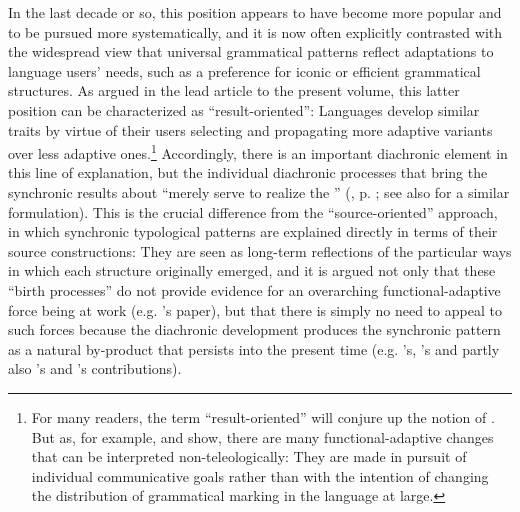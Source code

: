 \documentclass[output=paper]{langsci/langscibook}
\begin{document}
In the last decade or so, this position appears to have become more popular and to be pursued more systematically, and it is now often explicitly contrasted with the widespread view that universal grammatical patterns reflect adaptations to language users’ needs, such as a preference for iconic or efficient grammatical structures. As argued in the lead article to the present volume, this latter position can be characterized as “result-oriented”: Languages develop similar traits by virtue of their users selecting and propagating more adaptive variants over less adaptive ones.\footnote{For many readers, the term “result-oriented” will conjure up the notion of . But as, for example, \citet{Keller1994} and \citet[64--71]{Croft2000_Change} show, there are many functional-adaptive changes that can be interpreted non-teleologically: They are made in pursuit of individual communicative goals rather than with the intention of changing the distribution of grammatical marking in the language at large.} Accordingly, there is an important diachronic element in this line of explanation, but the individual diachronic processes that bring the synchronic results about “merely serve to realize the ” (, p. \pageref{p:haspelmath:merelyserve}; see also \citet[266]{Hawkins2004} for a similar formulation). This is the crucial difference from the “source-oriented” approach, in which synchronic typological patterns are explained directly in terms of their source constructions: They are seen as long-term reflections of the particular ways in which each structure originally emerged, and it is argued not only that these “birth processes” do not provide evidence for an overarching functional-adaptive force being at work (e.g. ’s paper), but that there is simply no need to appeal to such forces because the diachronic development produces the synchronic pattern as a natural by-product that persists into the present time (e.g. ’s, ’s and partly also ’s and ’s contributions). 
\end{document}
